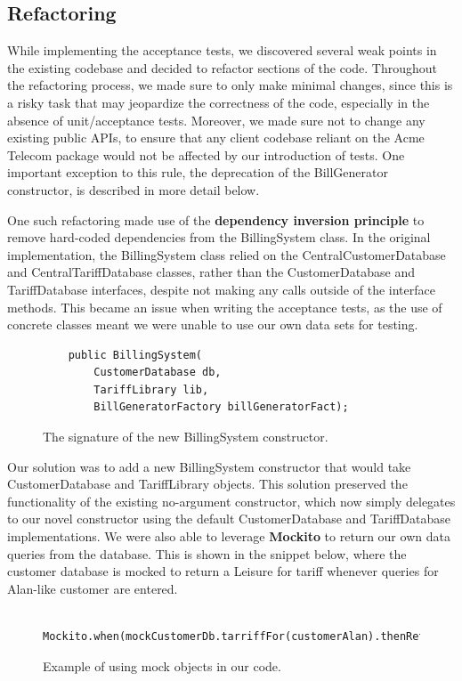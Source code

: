 \documentclass[a4paper]{article}
\begin{document}
\subsection{Refactoring}
While implementing the acceptance tests, we discovered several weak points in the existing codebase and decided to refactor sections of the code. Throughout the refactoring process, we made sure to only make minimal changes, since this is a risky task that may jeopardize the correctness of the code, especially in the absence of unit/acceptance tests. Moreover, we made sure not to change any existing public APIs, to ensure that any client codebase reliant on the Acme Telecom package would not be affected by our introduction of tests. One important exception to this rule, the deprecation of the BillGenerator constructor, is described in more detail below.

One such refactoring made use of the {\bf dependency inversion principle} to remove hard-coded dependencies from the BillingSystem class. In the original implementation, the BillingSystem class relied on the CentralCustomerDatabase and CentralTariffDatabase classes, rather than the CustomerDatabase and TariffDatabase interfaces, despite not making any calls outside of the interface methods. This became an issue when writing the acceptance tests, as the use of concrete classes meant we were unable to use our own data sets for testing. 

\begin{figure}[H]
\begin{verbatim}
    public BillingSystem(
        CustomerDatabase db,
        TariffLibrary lib,
        BillGeneratorFactory billGeneratorFact);
\end{verbatim}
\caption{The signature of the new BillingSystem constructor.}
\end{figure}

Our solution was to add a new BillingSystem constructor that would take CustomerDatabase and TariffLibrary objects. This solution preserved the functionality of the existing no-argument constructor, which now simply delegates to our novel constructor using the default CustomerDatabase and TariffDatabase implementations. We were also able to leverage {\bf Mockito} to return our own data queries from the database. This is shown in the snippet below, where the customer database is mocked to return a Leisure for tariff whenever queries for Alan-like customer are entered.

\begin{figure}[H]
\begin{verbatim}
    Mockito.when(mockCustomerDb.tarriffFor(customerAlan).thenReturn(Tariff.Leisure);
\end{verbatim}
\caption{Example of using mock objects in our code.}
\end{figure}
\end{document}
